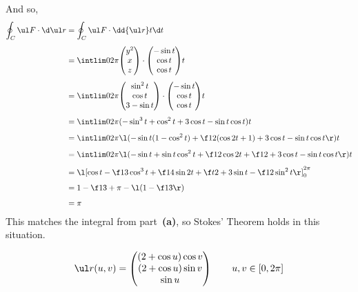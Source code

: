 \documentclass[a4paper]{article}
\begin{document}
And so, \begin{align*}
\oint_C \ul F \cdot \d \ul r &= \oint_C \ul F \cdot \dd {\ul r}t \d t\\[1ex]
&= \intlim 0{2\pi} {\begin{pmatrix} y^2 \\ x \\ z \end{pmatrix} \cdot \begin{pmatrix} -\sin t \\ \cos t \\ \cos t \end{pmatrix}} t\\[1ex]
&= \intlim 0{2\pi} {\begin{pmatrix} \sin^2 t \\ \cos t \\ 3 - \sin t \end{pmatrix} \cdot \begin{pmatrix} -\sin t \\ \cos t \\ \cos t \end{pmatrix}} t\\[1ex]
&= \intlim 0{2\pi} {(-\sin^3 t + \cos^2 t + 3 \cos t - \sin t \cos t)} t\\[1ex]
&= \intlim 0{2\pi} {\l( -\sin t (1 - \cos^2 t) + \f12 (\cos 2 t + 1) + 3 \cos t - \sin t \cos t \r)} t\\[1ex]
&= \intlim 0{2\pi} {\l( -\sin t + \sin t \cos^2 t + \f12 \cos 2 t + \f12 + 3 \cos t - \sin t \cos t \r)} t\\[1ex]
&= \l[ \cos t - \f13 \cos^3 t + \f14 \sin 2t + \f t2 + 3 \sin t - \f12 \sin^2 t \r]_0^{2\pi}\\[1ex]
&= 1 - \f13 + \pi - \l( 1 - \f13 \r)\\[1ex]
&= \pi
\end{align*}
This matches the integral from part~\textbf{(a)}, so Stokes' Theorem holds in this situation.



$$\ul r(u, v) = \begin{pmatrix} (2 + \cos u) \cos v \\ (2 + \cos u) \sin v \\ \sin u \end{pmatrix} \qquad u, v \in [0, 2\pi]$$

\subsection{~}
\end{document}
